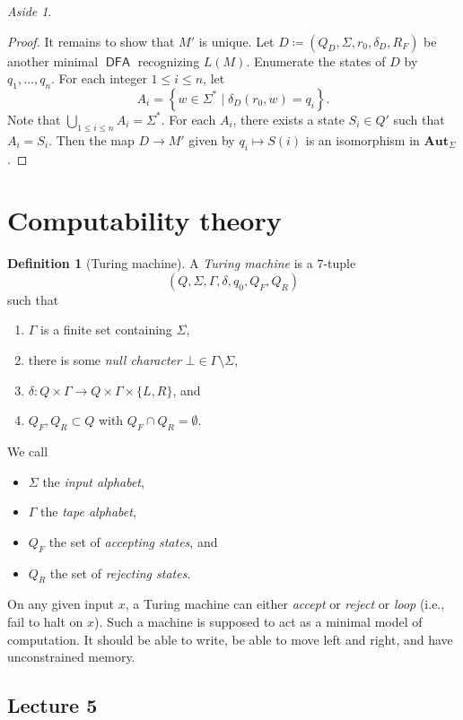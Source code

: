 \documentclass[10pt,letterpaper,cm]{nupset}
\theoremstyle{definition}
\newtheorem{definition}{Definition}[subsection]
\theoremstyle{theorem}
\theoremstyle{remark}
\newtheorem*{aside}{Aside}
\newcommand{\1}{\mathbf{1}}
\newcommand{\0}{\vec 0}
\DeclareMathOperator{\DFA}{\mathsf{DFA}}
\begin{document}
\begin{aside}
\begin{proof}
It remains to show that $M'$ is unique. Let $D\coloneqq \left(Q_D, \Sigma, r_0, \delta_D, R_F\right)$ be another minimal $\DFA$ recognizing $L(M)$. Enumerate the states of $D$ by $q_1, \ldots, q_n$. For each integer $1\leq i \leq n$, let $$A_i = \left\{w\in \Sigma^{\ast} \mid \delta_D(r_0, w) =q_i  \right\}.$$ Note that $\bigcup_{1\leq i \leq n}A_i = \Sigma^{\ast}$. For each $A_i$, there exists a state $S_i \in Q'$ such that $A_i = S_i$. Then the map $D \to M'$ given by $q_i \mapsto S(i)$ is an isomorphism in $\mathbf{Aut}_{\Sigma}$.
\end{proof}
\end{aside}

\section{Computability theory}

\begin{definition}[Turing machine]
A \textit{Turing machine} is a $7$-tuple $$\left(Q, \Sigma, \Gamma, \delta, q_0, Q_F, Q_R\right)$$ such that
\begin{enumerate}[label=(\roman*)]
\item $\Gamma$ is a finite set containing $\Sigma$, 
\item there is some \textit{null character} $\bot \in \Gamma \setminus \Sigma$,
\item $\delta : Q\times \Gamma \to Q \times \Gamma \times \{L, R\}$, and 
\item $Q_F, Q_R \subset Q$ with $Q_F \cap Q_R = \emptyset$. 
\end{enumerate}
We call 
\begin{itemize}
\item $\Sigma$ the \textit{input alphabet}, 
\item $\Gamma$ the \textit{tape alphabet}, 
\item $Q_F$ the set of \textit{accepting states}, and 
\item $Q_R$ the set of \textit{rejecting states}.
\end{itemize}
\end{definition}


On any given input $x$, a Turing machine can either \textit{accept} or \textit{reject} or \textit{loop} (i.e., fail to halt on $x$).
Such a machine is supposed to act as a minimal model of computation. It should be able to write, be able to move left and right, and have unconstrained memory.


\subsection{Lecture 5}
\end{document}
